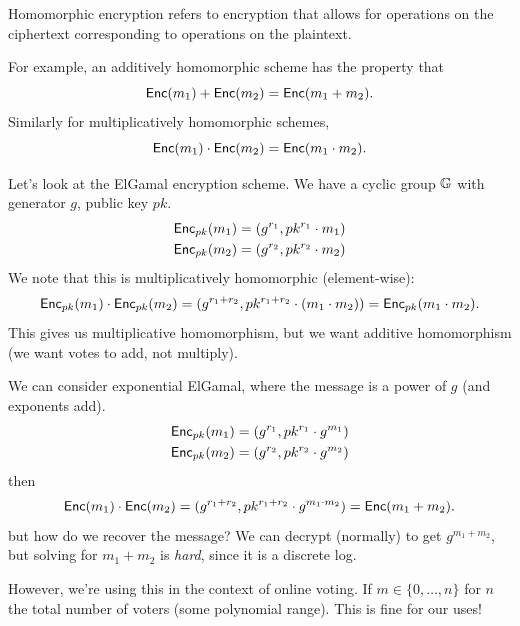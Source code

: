 Homomorphic encryption refers to encryption that allows for operations on the ciphertext corresponding to operations on the plaintext.

For example, an additively homomorphic scheme has the property that
\[\operatorname{\mathsf{Enc}}(m_1) + \operatorname{\mathsf{Enc}}(m_2) = \operatorname{\mathsf{Enc}}(m_1 + m_2).\]
Similarly for multiplicatively homomorphic schemes,
\[\operatorname{\mathsf{Enc}}(m_1) \cdot \operatorname{\mathsf{Enc}}(m_2) = \operatorname{\mathsf{Enc}}(m_1 \cdot m_2).\]

\begin{example}
    Let's look at the ElGamal encryption scheme. We have a cyclic group $\mathbb G$ with generator $g$, public key $pk$.
    \begin{align*}
        \operatorname{\mathsf{Enc}}_{pk}(m_1) & =(g^{r_1}, pk^{r_1}\cdot m_1) \\
        \operatorname{\mathsf{Enc}}_{pk}(m_2) & =(g^{r_2}, pk^{r_2}\cdot m_2)
    \end{align*}
    We note that this is multiplicatively homomorphic (element-wise):
    \[\operatorname{\mathsf{Enc}}_{pk}(m_1)\cdot \operatorname{\mathsf{Enc}}_{pk}(m_2) = (g^{r_1 + r_2}, pk^{r_1 + r_2}\cdot (m_1\cdot m_2)) = \operatorname{\mathsf{Enc}}_{pk}(m_1\cdot m_2).\]
    This gives us multiplicative homomorphism, but we want additive homomorphism (we want votes to add, not multiply).

    We can consider exponential ElGamal, where the message is a power of $g$ (and exponents add).
    \begin{align*}
        \operatorname{\mathsf{Enc}}_{pk}(m_1) & =(g^{r_1}, pk^{r_1}\cdot g^{m_1}) \\
        \operatorname{\mathsf{Enc}}_{pk}(m_2) & =(g^{r_2}, pk^{r_2}\cdot g^{m_2})
    \end{align*}
    then
    \[\operatorname{\mathsf{Enc}}(m_1)\cdot \operatorname{\mathsf{Enc}}(m_2) = (g^{r_1 + r_2}, pk^{r_1 + r_2}\cdot g^{m_1\cdot m_2}) = \operatorname{\mathsf{Enc}}(m_1 + m_2).\]
    but how do we recover the message? We can decrypt (normally) to get $g^{m_1 + m_2}$, but solving for $m_1 + m_2$ is \emph{hard}, since it is a discrete log.

    However, we're using this in the context of online voting. If $m\in \{0, \dots, n\}$ for $n$ the total number of voters (some polynomial range). This is fine for our uses!
\end{example}
